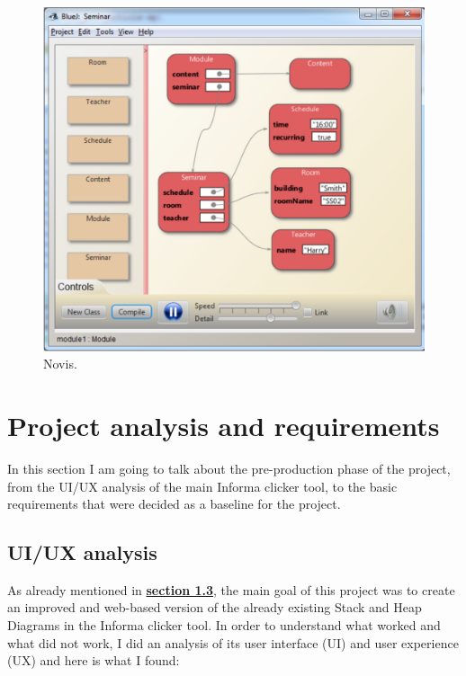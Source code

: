 \documentclass[]{usiinfbachelorproject}
\begin{document}
\begin{figure}[h]
\centering
\includegraphics[scale=0.5]{figures/Novis.png}
\caption {Novis.}
\end{figure}

\vspace{\fill}

\pagebreak

\section{Project analysis and requirements} \label{requirements+analysis}

In this section I am going to talk about the pre-production phase of the project, from the UI/UX analysis of the main Informa clicker tool, to the basic requirements that were decided as a baseline for the project.

\subsection{UI/UX analysis}

As already mentioned in \hyperref[goal]{\textbf{section 1.3}}, the main goal of this project was to create an improved and web-based version of the already existing Stack and Heap Diagrams in the Informa clicker tool. In order to understand what worked and what did not work, I did an analysis of its user interface (UI) and user experience (UX) and here is what I found:\\
\end{document}
